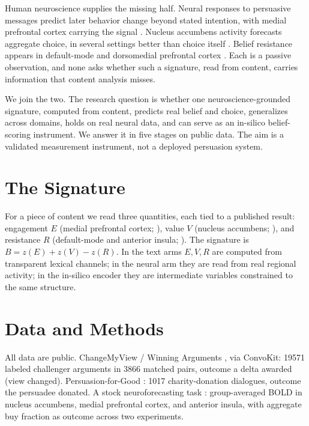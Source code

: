 \documentclass[11pt]{article}
\begin{document}
Human neuroscience supplies the missing half. Neural responses to persuasive messages predict later
behavior change beyond stated intention, with medial prefrontal cortex carrying the signal
\citep{falk2010predicting}. Nucleus accumbens activity forecasts aggregate choice, in several settings
better than choice itself \citep{genevsky2017when, knutson2018neuroforecasting, tong2020brain}. Belief
resistance appears in default-mode and dorsomedial prefrontal cortex \citep{kaplan2016neural}. Each is a
passive observation, and none asks whether such a signature, read from content, carries information that
content analysis misses.

We join the two. The research question is whether one neuroscience-grounded signature, computed from
content, predicts real belief and choice, generalizes across domains, holds on real neural data, and can
serve as an in-silico belief-scoring instrument. We answer it in five stages on public data. The aim is a
validated measurement instrument, not a deployed persuasion system.

\section{The Signature}
For a piece of content we read three quantities, each tied to a published result: engagement $E$ (medial
prefrontal cortex; \citealp{falk2010predicting}), value $V$ (nucleus accumbens;
\citealp{genevsky2017when}), and resistance $R$ (default-mode and anterior insula;
\citealp{kaplan2016neural}). The signature is $B = z(E) + z(V) - z(R)$. In the text arms $E, V, R$ are
computed from transparent lexical channels; in the neural arm they are read from real regional activity;
in the in-silico encoder they are intermediate variables constrained to the same structure.

\section{Data and Methods}
All data are public. ChangeMyView / Winning Arguments \citep{tan2016winning}, via ConvoKit: 19571 labeled
challenger arguments in 3866 matched pairs, outcome a delta awarded (view changed). Persuasion-for-Good
\citep{wang2019persuasion}: 1017 charity-donation dialogues, outcome the persuadee donated. A stock
neuroforecasting task \citep{kuhnen2005neural}: group-averaged BOLD in nucleus accumbens, medial
prefrontal cortex, and anterior insula, with aggregate buy fraction as outcome across two experiments.
\end{document}
